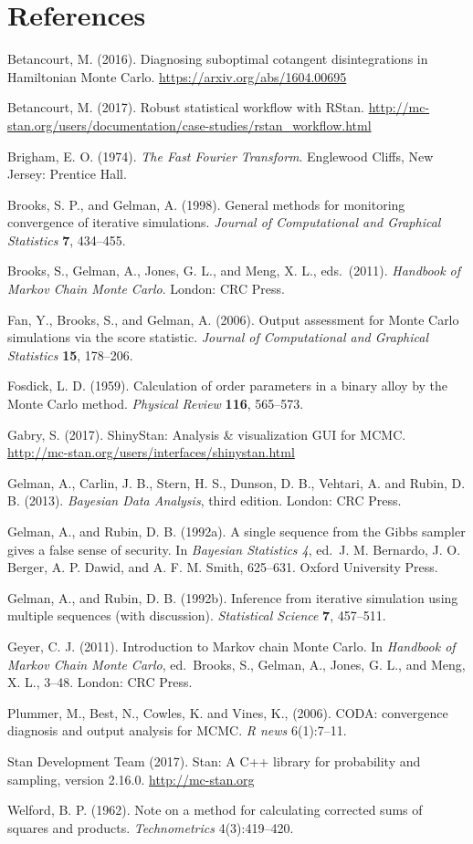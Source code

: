 \documentclass[11pt]{article}
\begin{document}
\section*{References}

\noindent

\bibitem Betancourt, M. (2016).  Diagnosing suboptimal cotangent disintegrations in Hamiltonian Monte Carlo. \url{https://arxiv.org/abs/1604.00695}

\bibitem Betancourt, M. (2017).  Robust statistical workflow with RStan.  \url{http://mc-stan.org/users/documentation/case-studies/rstan_workflow.html}

\bibitem Brigham, E. O. (1974). {\em The Fast Fourier Transform}.  Englewood Cliffs, New Jersey: Prentice Hall.

\bibitem Brooks, S. P., and Gelman, A. (1998).  General methods for monitoring convergence of iterative simulations.  {\em Journal of Computational and Graphical Statistics} {\bf 7}, 434--455.

\bibitem Brooks, S., Gelman, A., Jones, G. L., and Meng, X. L., eds.\ (2011).  {\em Handbook of Markov Chain Monte Carlo}.  London:  CRC Press.

\bibitem Fan, Y., Brooks, S., and Gelman, A. (2006).  Output assessment for Monte Carlo simulations via the score statistic. {\em Journal of Computational and Graphical Statistics} {\bf 15}, 178--206.

\bibitem Fosdick, L. D. (1959).  Calculation of order parameters in a binary alloy by the Monte Carlo method. {\em Physical Review} {\bf 116}, 565--573.

\bibitem Gabry, S. (2017).  ShinyStan:  Analysis \& visualization GUI for MCMC.  \url{http://mc-stan.org/users/interfaces/shinystan.html}

\bibitem Gelman, A., Carlin, J. B., Stern, H. S., Dunson, D. B., Vehtari, A. and Rubin, D. B. (2013). {\em Bayesian Data Analysis}, third edition. London:  CRC Press.

\bibitem Gelman, A., and Rubin, D. B. (1992a).  A single sequence from the Gibbs sampler gives a false sense of security.
In {\em Bayesian Statistics 4}, ed.\ J. M. Bernardo, J. O. Berger, A. P. Dawid, and A. F. M. Smith, 625--631.  Oxford University Press.

\bibitem Gelman, A., and Rubin, D. B. (1992b).   Inference from iterative simulation using multiple sequences (with discussion).  {\em Statistical Science} {\bf 7}, 457--511.

\bibitem Geyer, C. J. (2011). Introduction to Markov chain Monte Carlo. In {\em Handbook of Markov Chain Monte Carlo}, ed.\ Brooks, S., Gelman, A., Jones, G. L., and Meng, X. L., 3--48.  London:  CRC Press.

\bibitem Plummer, M., Best, N., Cowles, K. and Vines, K., (2006). CODA: convergence diagnosis and output analysis for MCMC. {\em R news} 6(1):7--11.

\bibitem Stan Development Team (2017). Stan: A C++ library for probability and sampling, version 2.16.0.   \url{http://mc-stan.org}

\bibitem Welford, B. P. (1962). Note on a method for calculating corrected sums of squares and products. {\em Technometrics} 4(3):419--420.
\end{document}
